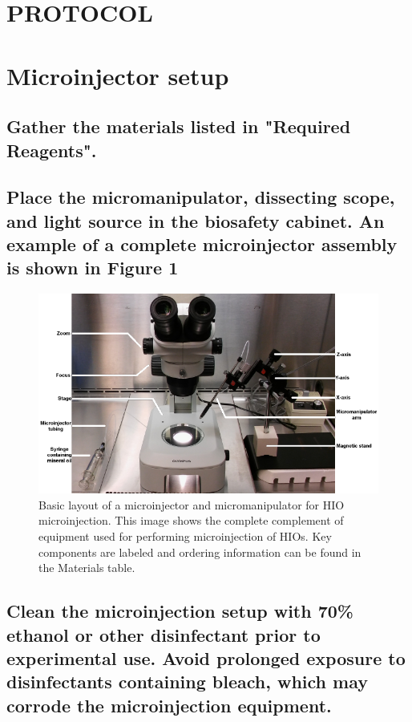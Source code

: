 \documentclass[11pt]{article}
\begin{document}
\section*{PROTOCOL}
\section{{\sffamily } Microinjector setup}
\label{sec:orgheadline10}
\subsection{{\sffamily } Gather the materials listed in "Required Reagents".}
\label{sec:orgheadline1}
\subsection{{\sffamily } Place the micromanipulator, dissecting scope, and light source in the biosafety cabinet. An example of a complete microinjector assembly is shown in \textbf{Figure 1}}
\label{sec:orgheadline2}
\begin{figure}[h]
\centering
\includegraphics[width=0.9\linewidth]{./img/figure1.pdf}
\caption{Basic layout of a microinjector and micromanipulator for HIO microinjection. This image shows the complete complement of equipment used for performing microinjection of HIOs. Key components are labeled and ordering information can be found in the Materials table.}
\end{figure}
\subsection{{\sffamily } Clean the microinjection setup with 70\% ethanol or other disinfectant prior to experimental use. Avoid prolonged exposure to disinfectants containing bleach, which may corrode the microinjection equipment.}
\label{sec:orgheadline3}
\end{document}
